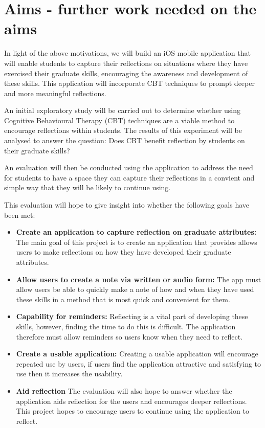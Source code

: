 \documentclass{l4proj}
\begin{document}
\section{Aims - further work needed on the aims}
In light of the above motivations, we will build an iOS mobile application that will enable
students to capture their reflections on situations where they have exercised their 
graduate skills, encouraging the awareness and development of these skills. This 
application will incorporate CBT techniques to prompt deeper and more meaningful 
reflections. 
\par 
An initial exploratory study will be carried out to determine whether using Cognitive 
Behavioural Therapy (CBT) techniques are a viable method to encourage reflections within 
students. The results of this experiment will be analysed to answer the question: 
Does CBT benefit reflection by students on their graduate skills?
\par 
An evaluation will then be conducted using the application to address the need for 
students to have a space they can capture their reflections in a convient and simple way
that they will be likely to continue using. 
\par 
This evaluation will hope to give insight into whether the following goals have been met:
\begin{itemize}
    \item \textbf{Create an application to capture reflection on graduate attributes:} The
    main goal of this project is to create an application that provides allows 
    users to make reflections on how they have developed their graduate attributes.
    \item \textbf{Allow users to create a note via written or audio form:} The app must 
    allow users be able to quickly make a note of how and when they have used these 
    skills in a method that is most quick and convenient for them.
    \item \textbf{Capability for reminders:} Reflecting is a vital part of developing these
    skills, however, finding the time to do this is difficult. The application therefore
    must allow reminders so users know when they need to reflect.
    \item \textbf{Create a usable application:} Creating a usable application will 
    encourage repeated use by users, if users find the application attractive and satisfying
    to use then it increases the usability.
    \item \textbf{Aid reflection} The evaluation will also hope to answer whether the 
    application aids reflection for the users and encourages deeper reflections. This 
    project hopes to encourage users to continue using the application to reflect.
\end{itemize}
\end{document}
